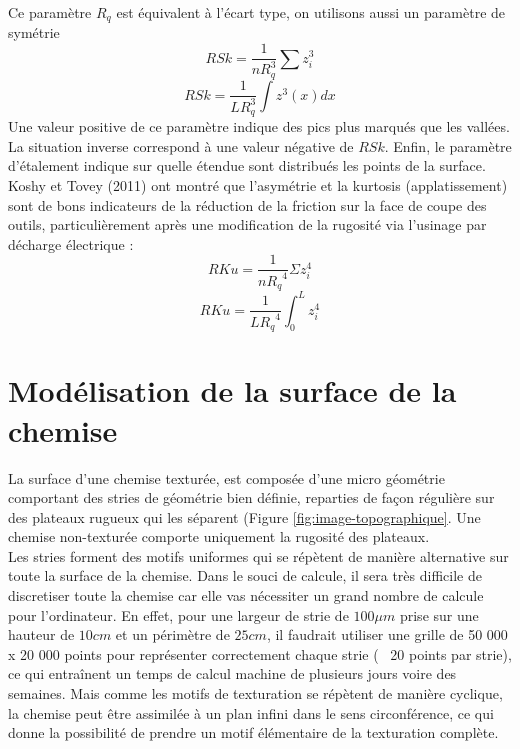 Ce paramètre $R_q$ est équivalent à l’écart type, on utilisons aussi un paramètre de symétrie
\begin{equation}
	RSk=\frac{1}{n{R}_{q}^{3}}\sum {z}_{i}^{3}
\end{equation}
\begin{equation}
	RSk=\frac{1}{L{R}_{q}^{3}}{\int }{z}^{3}\left(x\right)dx
\end{equation}
Une valeur positive de ce paramètre indique des pics plus marqués que les vallées. La
situation inverse correspond à une valeur négative de $RSk$. Enfin, le paramètre d’étalement
indique sur quelle étendue sont distribués les points de la surface. Koshy et Tovey (2011) ont montré que l'asymétrie et la kurtosis (applatissement) sont de bons indicateurs de la réduction de la friction sur la face de coupe des outils, particulièrement après une modification de la rugosité via l'usinage par décharge électrique\cite{trobo2} :
\begin{equation}
	RKu=\frac{1}{n{R_q}^{4}}\Sigma {z}_{i}^{4}
\end{equation}
\begin{equation}
	RKu=\frac{1}{L{R_q}^{4}}\int_{0}^{L}{z}_{i}^{4}
\end{equation}
\section{Modélisation de la surface de la chemise}
La surface d’une chemise texturée, est composée d’une micro géométrie comportant des stries de géométrie bien définie, reparties de façon régulière sur des plateaux rugueux qui les séparent (Figure \ref{fig:image-topographique}. Une chemise non-texturée comporte uniquement la rugosité des plateaux.\\

Les stries forment des motifs uniformes qui se répètent de manière alternative sur toute la surface de la chemise. Dans le souci de calcule, il sera très difficile de discretiser toute la chemise car elle vas nécessiter un grand nombre de calcule pour l'ordinateur. En effet, pour une largeur de strie de $100 \mu m$ prise sur une hauteur de $10 cm$ et un périmètre de $25 cm$, il faudrait utiliser une grille de 50 000 x 20 000 points pour représenter correctement chaque strie (~ 20 points par strie), ce qui entraînent un temps de calcul machine de plusieurs jours voire des semaines. Mais comme les motifs de texturation se répètent de manière cyclique, la chemise peut être assimilée à un plan infini dans le sens circonférence, ce qui donne la possibilité de prendre un motif élémentaire de la texturation complète.\\


